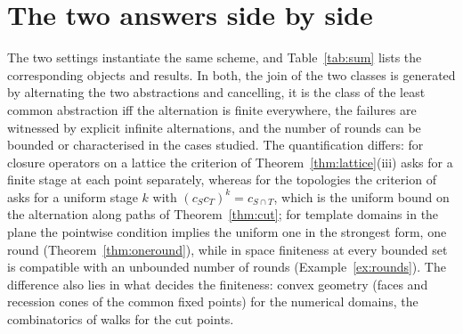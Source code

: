 \documentclass[11pt]{amsart}
\theoremstyle{definition}
\begin{document}
\section{The two answers side by side}\label{sec:summary}

The two settings instantiate the same scheme, and Table~\ref{tab:sum}
lists the corresponding objects and results. In both, the join of the two classes
is generated by alternating the two abstractions and cancelling, it is
the class of the least common abstraction iff the alternation is finite
everywhere, the failures are witnessed by explicit infinite
alternations, and the number of rounds can be bounded or characterised
in the cases studied. The quantification differs: for closure operators
on a lattice the criterion of Theorem~\ref{thm:lattice}(iii) asks for a
finite stage at each point separately, whereas for the topologies the
criterion of \cite{Fijoin} asks for a uniform stage $k$ with $(c_Sc_T)^k
=c_{S\cap T}$, which is the uniform bound on the alternation along
paths of Theorem~\ref{thm:cut}; for template domains in the plane the
pointwise condition implies the uniform one in the strongest form, one
round (Theorem~\ref{thm:oneround}), while in space finiteness at every
bounded set is compatible with an unbounded number of rounds
(Example~\ref{ex:rounds}). The difference also lies in what decides the
finiteness: convex geometry (faces and
recession cones of the common fixed points) for the numerical domains,
the combinatorics of walks for the cut points.
\end{document}
